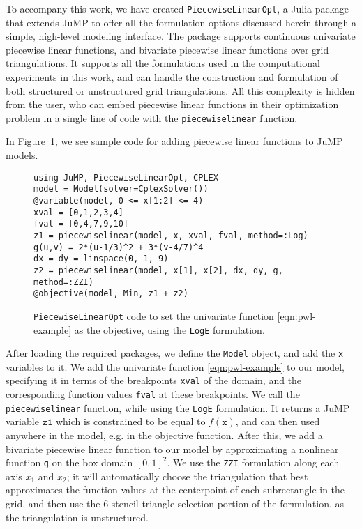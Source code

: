 \documentclass[opre,nonblindrev]{informs3} %
\newcommand{\ZZI}{\texttt{ZZI}}
\newcommand{\Log}{\texttt{LogE}}
\begin{document}
To accompany this work, we have created \texttt{PiecewiseLinearOpt}, a Julia package that extends JuMP to offer all the formulation options discussed herein through a simple, high-level modeling interface. The package supports continuous univariate piecewise linear functions, and bivariate piecewise linear functions over grid triangulations. It supports all the formulations used in the computational experiments in this work, and can handle the construction and formulation of both structured or unstructured grid triangulations. All this complexity is hidden from the user, who can embed piecewise linear functions in their optimization problem in a single line of code with the \texttt{piecewiselinear} function.

In Figure~\ref{fig:1D-pwl-code}, we see sample code for adding piecewise linear functions to JuMP models.
\begin{figure}
\footnotesize
\begin{lstlisting}
using JuMP, PiecewiseLinearOpt, CPLEX
model = Model(solver=CplexSolver())
@variable(model, 0 <= x[1:2] <= 4)
xval = [0,1,2,3,4]
fval = [0,4,7,9,10]
z1 = piecewiselinear(model, x, xval, fval, method=:Log)
g(u,v) = 2*(u-1/3)^2 + 3*(v-4/7)^4
dx = dy = linspace(0, 1, 9)
z2 = piecewiselinear(model, x[1], x[2], dx, dy, g, method=:ZZI)
@objective(model, Min, z1 + z2)
\end{lstlisting}
\caption{\texttt{PiecewiseLinearOpt} code to set the univariate function \eqref{eqn:pwl-example} as the objective, using the \Log{} formulation.}
\label{fig:1D-pwl-code}
\end{figure}
After loading the required packages, we define the \texttt{Model} object, and add the \texttt{x} variables to it. We add the univariate function \eqref{eqn:pwl-example} to our model, specifying it in terms of the breakpoints \texttt{xval} of the domain, and the corresponding function values \texttt{fval} at these breakpoints. We call the \texttt{piecewiselinear} function, while using the \Log{} formulation. It returns a JuMP variable $\texttt{z1}$ which is constrained to be equal to $f(\texttt{x})$, and can then used anywhere in the model, e.g. in the objective function. After this, we add a bivariate piecewise linear function to our model by approximating a nonlinear function \texttt{g} on the box domain $[0,1]^2$. We use the \ZZI{} formulation along each axis $x_1$ and $x_2$; it will automatically choose the triangulation that best approximates the function values at the centerpoint of each subrectangle in the grid, and then use the 6-stencil triangle selection portion of the formulation, as the triangulation is unstructured.
\end{document}
